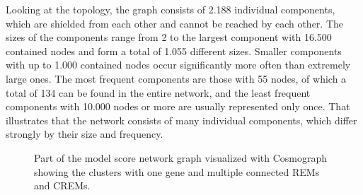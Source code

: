 \documentclass[pdftex,12pt,a4paper]{report}
\begin{document}
Looking at the topology, the graph consists of 2.188 individual components, which are shielded from each other and cannot be reached by each other. The sizes of the components range from 2 to the largest component with 16.500 contained nodes and form a total of 1.055 different sizes. Smaller components with up to 1.000 contained nodes occur significantly more often than extremely large ones. The most frequent components are those with 55 nodes, of which a total of 134 can be found in the entire network, and the least frequent components with 10.000 nodes or more are usually represented only once. That illustrates that the network consists of many individual components, which differ strongly by their size and frequency.
\begin{figure}[!ht]
\begin{center}
	\caption{Part of the model score network graph visualized with Cosmograph\cite{cosmograph} showing the clusters with one gene and multiple connected REMs and CREMs.}
	\label{network}
\end{center}
\end{figure}
\end{document}
